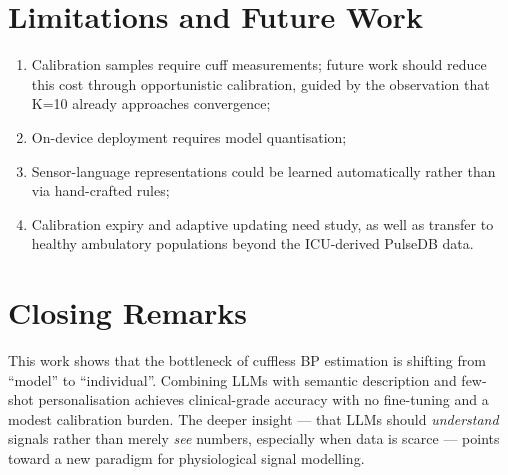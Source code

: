 \section{Limitations and Future Work}

\begin{enumerate}
  \item Calibration samples require cuff measurements; future work should reduce this cost through opportunistic calibration, guided by the observation that K=10 already approaches convergence;
  \item On-device deployment requires model quantisation;
  \item Sensor-language representations could be learned automatically rather than via hand-crafted rules;
  \item Calibration expiry and adaptive updating need study, as well as transfer to healthy ambulatory populations beyond the ICU-derived PulseDB data.
\end{enumerate}

\section{Closing Remarks}

This work shows that the bottleneck of cuffless BP estimation is shifting from ``model'' to ``individual''. Combining LLMs with semantic description and few-shot personalisation achieves clinical-grade accuracy with no fine-tuning and a modest calibration burden. The deeper insight --- that LLMs should \emph{understand} signals rather than merely \emph{see} numbers, especially when data is scarce --- points toward a new paradigm for physiological signal modelling.
